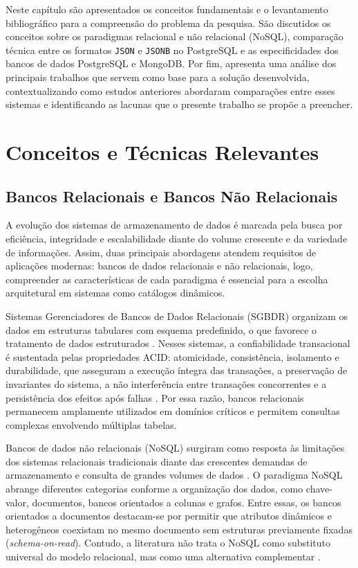 Neste capítulo são apresentados os conceitos fundamentais e o levantamento bibliográfico para a compreensão do problema da pesquisa. São discutidos os conceitos sobre os paradigmas relacional e não relacional (NoSQL), comparação técnica entre os formatos \texttt{JSON} e \texttt{JSONB} no PostgreSQL e as especificidades dos bancos de dados PostgreSQL e MongoDB. Por fim, apresenta uma análise dos principais trabalhos que servem como base para a solução desenvolvida, contextualizando como estudos anteriores abordaram comparações entre esses sistemas e identificando as lacunas que o presente trabalho se propõe a preencher.

\section{Conceitos e Técnicas Relevantes}
\subsection{Bancos Relacionais e Bancos Não Relacionais}
\label{sec:relacional-vs-nao-relacional}

A evolução dos sistemas de armazenamento de dados é marcada pela busca por eficiência, integridade e escalabilidade diante do volume crescente e da variedade de informações. Assim, duas principais abordagens atendem requisitos de aplicações modernas: bancos de dados relacionais e não relacionais, logo, compreender as características de cada paradigma é essencial para a escolha arquitetural em sistemas como catálogos dinâmicos.

Sistemas Gerenciadores de Bancos de Dados Relacionais (SGBDR) organizam os dados em estruturas tabulares com esquema predefinido, 
o que favorece o tratamento de dados estruturados \cite{matcha2025database}. Nesses sistemas, a confiabilidade transacional é sustentada pelas 
propriedades ACID: atomicidade, consistência, isolamento e 
durabilidade, que asseguram a execução íntegra das transações,  
a preservação de invariantes do sistema, a não interferência entre 
transações concorrentes e a persistência dos efeitos após falhas 
\cite{waterpeace2026sok}.
Por essa razão, bancos relacionais 
permanecem amplamente utilizados em domínios críticos e permitem consultas complexas envolvendo múltiplas tabelas.

Bancos de dados não relacionais (NoSQL) surgiram como resposta às limitações dos sistemas relacionais tradicionais diante das crescentes demandas de armazenamento e consulta de grandes volumes de dados \cite{davoudian2018}. O paradigma NoSQL abrange diferentes categorias conforme a organização dos dados, como chave-valor, documentos, bancos orientados a colunas e grafos. Entre essas, os bancos orientados a documentos destacam-se por permitir que atributos dinâmicos e heterogêneos coexistam no mesmo documento sem estruturas previamente fixadas (\textit{schema-on-read}). Contudo, a literatura não trata o NoSQL como substituto universal do modelo relacional, mas como uma alternativa complementar \cite{nayak2013}.

